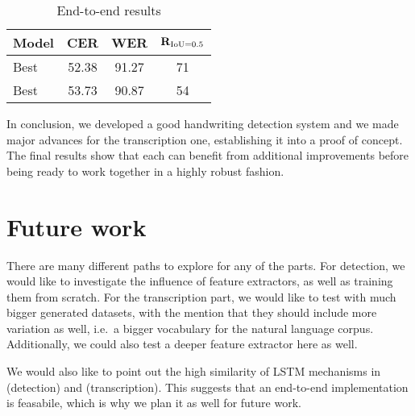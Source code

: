 \begin{table}[htb]
\begin{tabular}{| l | *3{c |}}\hline
	\bf Model     & \bf CER & \bf WER & \(\mathbf{R}_{\operatorname{IoU} = 0.5}\)\\\hline
	Best \FRCNN{} & 52.38   & 91.27   & 71\\
	Best \CTPN{}  & 53.73   & 90.87   & 54\\\hline
\end{tabular}
\caption{End-to-end results}\label{tab:e2e_results}
\end{table}

In conclusion, we developed a good handwriting detection system and we made major advances for the transcription one, establishing it into a proof of concept. The final results show that each can benefit from additional improvements before being ready to work together in a highly robust fashion.

\section{Future work}
There are many different paths to explore for any of the parts. For detection, we would like to investigate the influence of feature extractors, as well as training them from scratch. For the transcription part, we would like to test with much bigger generated datasets, with the mention that they should include more variation as well, i.e.\ a bigger vocabulary for the natural language corpus. Additionally, we could also test a deeper feature extractor here as well.

We would also like to point out the high similarity of LSTM mechanisms in \CTPN{} (detection) and \CRNN{} (transcription). This suggests that an end-to-end implementation is feasabile, which is why we plan it as well for future work.

